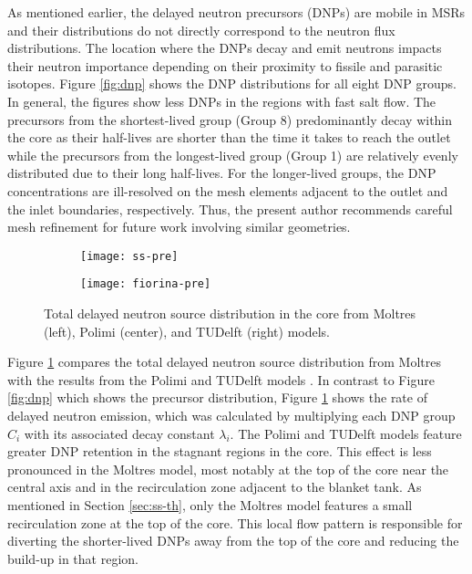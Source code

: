 As mentioned earlier, the delayed neutron precursors (DNPs) are mobile in
\glspl{MSR} and their distributions do not directly correspond to the neutron
flux distributions. The location where the \glspl{DNP} decay and emit neutrons
impacts their neutron
importance depending on their proximity to fissile and parasitic isotopes.
Figure \ref{fig:dnp} shows the \gls{DNP} distributions for all eight \gls{DNP}
groups. In general, the figures show less \glspl{DNP} in the regions with fast
salt flow. The
precursors from the shortest-lived group (Group 8) predominantly decay within
the core as their half-lives are shorter than the time it takes to reach the
outlet while the precursors from the longest-lived group (Group 1) are
relatively evenly distributed due to their long half-lives. For the
longer-lived groups, the \gls{DNP} concentrations are ill-resolved on the
mesh elements adjacent to the outlet and the inlet boundaries, respectively.
Thus, the present author recommends careful mesh refinement for future work
involving similar geometries.

\begin{figure}[b!]
    \centering
    \begin{subfigure}[t]{.30\textwidth}
        \centering
        \vspace{.9cm}
        \texttt{[image: ss-pre]}
    \end{subfigure}
    \begin{subfigure}[t]{.69\textwidth}
        \centering
        \vspace{0pt}
        \texttt{[image: fiorina-pre]}
    \end{subfigure}
    \caption{Total delayed neutron source distribution in the core from
    Moltres (left), Polimi (center), and TUDelft (right) models.}
    \label{fig:pre}
\end{figure}

Figure \ref{fig:pre} compares the total delayed neutron source
distribution from Moltres with the results from the Polimi and TUDelft models
\cite{fiorina_modelling_2014}. In contrast to Figure \ref{fig:dnp} which shows
the precursor distribution, Figure \ref{fig:pre} shows the rate of delayed
neutron emission, which was calculated by multiplying each \gls{DNP} group
$C_i$ with its associated decay constant $\lambda_i$.
The Polimi and TUDelft models
feature greater \gls{DNP} retention in the stagnant regions in the core. This
effect is less pronounced in the Moltres model, most notably at the top of the
core near the central axis and in the recirculation zone adjacent to the
blanket tank. As mentioned in Section \ref{sec:ss-th}, only the Moltres model
features a small recirculation zone at the top of the core. This local flow
pattern is responsible for diverting the shorter-lived \glspl{DNP} away from
the top of the core and reducing the build-up in that region.

